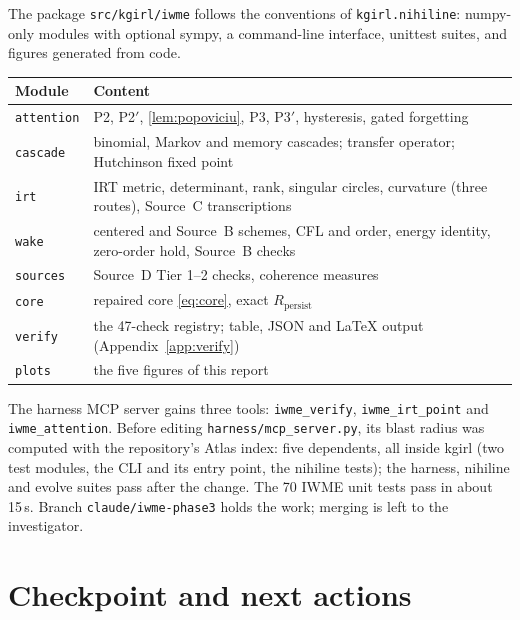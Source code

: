 \documentclass[11pt]{article}
\theoremstyle{definition}
\theoremstyle{remark}
\newcommand{\code}[1]{\texttt{#1}}
\begin{document}
The package \code{src/kgirl/iwme} follows the conventions of \code{kgirl.nihiline}: numpy-only modules with optional sympy, a command-line interface, unittest suites, and figures generated from code.
\begin{center}\small
\begin{tabularx}{\textwidth}{@{}l>{\raggedright\arraybackslash}X@{}}
\toprule
Module & Content \\
\midrule
\code{attention} & P2, P2$'$, \cref{lem:popoviciu}, P3, P3$'$, hysteresis, gated forgetting \\
\code{cascade} & binomial, Markov and memory cascades; transfer operator; Hutchinson fixed point \\
\code{irt} & IRT metric, determinant, rank, singular circles, curvature (three routes), Source~C transcriptions \\
\code{wake} & centered and Source~B schemes, CFL and order, energy identity, zero-order hold, Source~B checks \\
\code{sources} & Source~D Tier 1--2 checks, coherence measures \\
\code{core} & repaired core \eqref{eq:core}, exact $R_{\mathrm{persist}}$ \\
\code{verify} & the 47-check registry; table, JSON and \LaTeX{} output (Appendix~\ref{app:verify}) \\
\code{plots} & the five figures of this report \\
\bottomrule
\end{tabularx}
\end{center}
The harness MCP server gains three tools: \code{iwme\_verify}, \code{iwme\_irt\_point} and \code{iwme\_attention}. Before editing \code{harness/mcp\_server.py}, its blast radius was computed with the repository's Atlas index: five dependents, all inside kgirl (two test modules, the CLI and its entry point, the nihiline tests); the harness, nihiline and evolve suites pass after the change. The 70 IWME unit tests pass in about 15\,s. Branch \code{claude/iwme-phase3} holds the work; merging is left to the investigator.

\section{Checkpoint and next actions}
\end{document}
